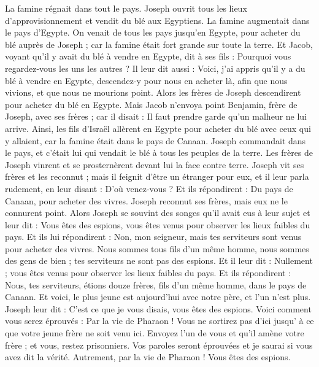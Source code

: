 \begin{multicols}{2}
La famine régnait dans tout le pays. Joseph ouvrit tous les lieux d'approvisionnement et vendit du blé aux Egyptiens. La famine augmentait dans le pays d'Egypte.
On venait de tous les pays jusqu'en Egypte, pour acheter du blé auprès de Joseph ; car la famine était fort grande sur toute la terre.
\VerseOne{}Et Jacob, voyant qu'il y avait du blé à vendre en Egypte, dit à ses fils : Pourquoi vous regardez-vous les uns les autres ?
Il leur dit aussi : Voici, j'ai appris qu'il y a du blé à vendre en Egypte, descendez-y pour nous en acheter là, afin que nous vivions, et que nous ne mourions point.
Alors les frères de Joseph descendirent pour acheter du blé en Egypte.
Mais Jacob n'envoya point Benjamin, frère de Joseph, avec ses frères ; car il disait : Il faut prendre garde qu'un malheur ne lui arrive.
Ainsi, les fils d'Israël allèrent en Egypte pour acheter du blé avec ceux qui y allaient, car la famine était dans le pays de Canaan.
Joseph commandait dans le pays, et c'était lui qui vendait le blé à tous les peuples de la terre. Les frères de Joseph vinrent et se prosternèrent devant lui la face contre terre.
Joseph vit ses frères et les reconnut ; mais il feignit d'être un étranger pour eux, et il leur parla rudement, en leur disant : D'où venez-vous ? Et ils répondirent : Du pays de Canaan, pour acheter des vivres.
Joseph reconnut ses frères, mais eux ne le connurent point.
Alors Joseph se souvint des songes qu'il avait eus à leur sujet et leur dit : Vous êtes des espions, vous êtes venus pour observer les lieux faibles du pays.
Et ils lui répondirent : Non, mon seigneur, mais tes serviteurs sont venus pour acheter des vivres.
Nous sommes tous fils d'un même homme, nous sommes des gens de bien ; tes serviteurs ne sont pas des espions.
Et il leur dit : Nullement ; vous êtes venus pour observer les lieux faibles du pays.
Et ils répondirent : Nous, tes serviteurs, étions douze frères, fils d'un même homme, dans le pays de Canaan. Et voici, le plus jeune est aujourd'hui avec notre père, et l'un n'est plus.
Joseph leur dit : C'est ce que je vous disais, vous êtes des espions.
Voici comment vous serez éprouvés : Par la vie de Pharaon ! Vous ne sortirez pas d'ici jusqu' à ce que votre jeune frère ne soit venu ici.
Envoyez l'un de vous et qu'il amène votre frère ; et vous, restez prisonniers. Vos paroles seront éprouvées et je saurai si vous avez dit la vérité. Autrement, par la vie de Pharaon ! Vous êtes des espions.

\end{multicols}
